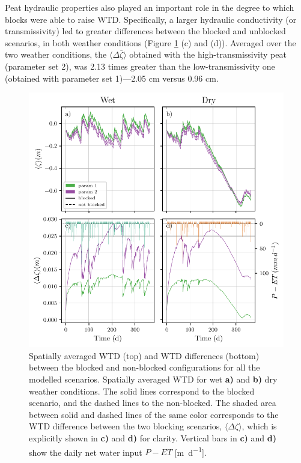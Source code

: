 \documentclass[bg, manuscript]{copernicus}
\begin{document}
Peat hydraulic properties also played an important role in the degree to which blocks were able to raise WTD.
Specifically, a larger hydraulic conductivity (or transmissivity) led to greater differences between the blocked and unblocked scenarios, in both weather conditions (Figure \ref{fig:combined_wtd_and_diff_weathers_and_params} (c) and (d)).
Averaged over the two weather conditions, the $\langle \Delta \bar{\zeta}\rangle$ obtained with the high-transmissivity peat (parameter set 2), was 2.13 times greater than the low-transmissivity one (obtained with parameter set 1)---2.05 \unit{cm} versus 0.96 \unit{cm}.

\begin{figure}[t]
\centering
\includegraphics[width=12 cm]{figs/combined_every_param_diff_vs_time_wet_and_dry.pdf}
\caption{Spatially averaged WTD (top) and WTD differences (bottom) between the blocked and non-blocked configurations for all the modelled scenarios. Spatially averaged WTD for wet \textbf{a)} and \textbf{b)} dry weather conditions. The solid lines correspond to the blocked scenario, and the dashed lines to the non-blocked. The shaded area between solid and dashed lines of the same color corresponds to the WTD difference between the two blocking scenarios, $\langle\Delta\zeta\rangle$, which is explicitly shown in \textbf{c)} and \textbf{d)} for clarity. Vertical bars in \textbf{c)} and \textbf{d)} show the daily net water input $P - ET$ [\unit{m d^{-1}}].}
\label{fig:combined_wtd_and_diff_weathers_and_params}
\end{figure}   
\end{document}
